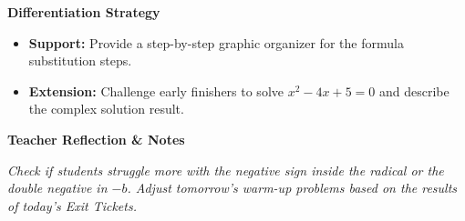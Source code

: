 \documentclass[10pt]{article}
\newcommand{\sectiontitle}[1]{{\color{brandnavy}\fontsize{12pt}{14pt}\bfseries\sffamily #1}\par}
\begin{document}
\begin{minipage}[t]{0.48\linewidth}
    \sectiontitle{Differentiation Strategy}
    \vspace{4pt}
    \begin{itemize}
        \item \textbf{Support:} Provide a step-by-step graphic organizer for the formula substitution steps.
        \item \textbf{Extension:} Challenge early finishers to solve $x^2 - 4x + 5 = 0$ and describe the complex solution result.
    \end{itemize}
\end{minipage}\hfill
\begin{minipage}[t]{0.48\linewidth}
    \sectiontitle{Teacher Reflection \& Notes}
    \vspace{4pt}
    \begin{tcolorbox}[
        colback=softgrey,
        colframe=bordergrey,
        arc=2pt,
        outer arc=2pt,
        left=8pt,
        right=8pt,
        top=8pt,
        bottom=8pt,
        boxsep=0pt
    ]
        {\fontsize{9pt}{12pt}\selectfont\itshape Check if students struggle more with the negative sign inside the radical or the double negative in $-b$. Adjust tomorrow's warm-up problems based on the results of today's Exit Tickets.}
    \end{tcolorbox}
\end{minipage}
\end{document}

